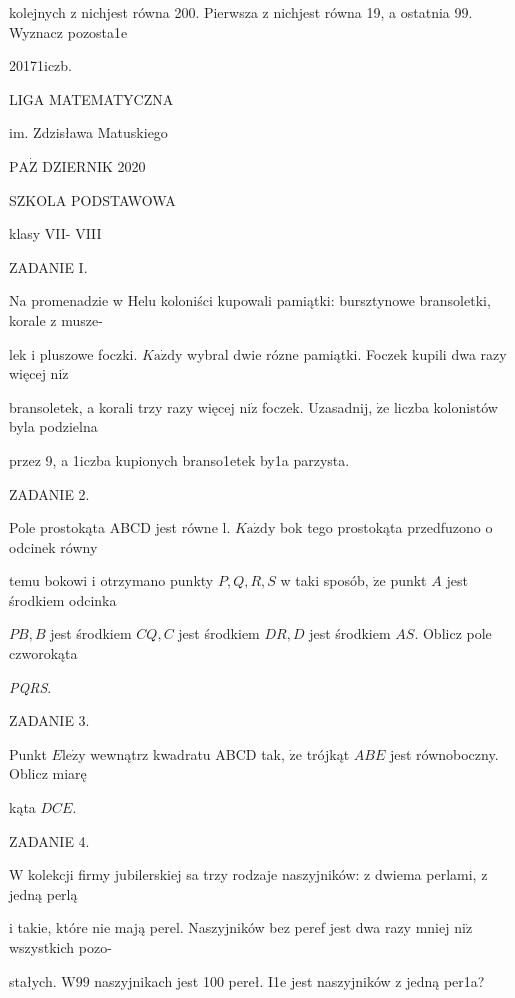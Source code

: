 \documentclass[a4paper,12pt]{article}
\begin{document}
kolejnych z nichjest równa 200. Pierwsza z nichjest równa 19, a ostatnia 99. Wyznacz pozosta1e

20171iczb.






LIGA MATEMATYCZNA

im. Zdzisława Matuskiego

$\mathrm{P}\mathrm{A}\dot{\mathrm{Z}}$ DZIERNIK 2020

SZKOLA PODSTAWOWA

klasy VII- VIII

ZADANIE I.

Na promenadzie w Helu koloniści kupowali pamiątki: bursztynowe bransoletki, korale z musze-

lek i pluszowe foczki. $K\mathrm{a}\dot{\mathrm{z}}\mathrm{d}\mathrm{y}$ wybral dwie rózne pamiątki. Foczek kupili dwa razy więcej $\mathrm{n}\mathrm{i}\dot{\mathrm{z}}$

bransoletek, a korali trzy razy więcej $\mathrm{n}\mathrm{i}\dot{\mathrm{z}}$ foczek. Uzasadnij, $\dot{\mathrm{z}}\mathrm{e}$ liczba kolonistów byla podzielna

przez 9, a 1iczba kupionych branso1etek by1a parzysta.

ZADANIE 2.

Pole prostokąta ABCD jest równe l. $K\mathrm{a}\dot{\mathrm{z}}\mathrm{d}\mathrm{y}$ bok tego prostokąta przedfuzono o odcinek równy

temu bokowi i otrzymano punkty $P, Q, R, S$ w taki sposób, $\dot{\mathrm{z}}\mathrm{e}$ punkt $A$ jest środkiem odcinka

$PB, B$ jest środkiem $CQ, C$ jest środkiem $DR, D$ jest środkiem $AS$. Oblicz pole czworokąta

{\it PQRS}.

ZADANIE 3.

Punkt $E\mathrm{l}\mathrm{e}\dot{\mathrm{z}}\mathrm{y}$ wewnątrz kwadratu ABCD tak, $\dot{\mathrm{z}}\mathrm{e}$ trójkąt $ABE$ jest równoboczny. Oblicz miarę

kąta $DCE.$

ZADANIE 4.

$\mathrm{W}$ kolekcji firmy jubilerskiej sa trzy rodzaje naszyjników: z dwiema perlami, z jedną perlą

i takie, które nie mają perel. Naszyjników bez peref jest dwa razy mniej $\mathrm{n}\mathrm{i}\dot{\mathrm{z}}$ wszystkich pozo-

stałych. $\mathrm{W}99$ naszyjnikach jest 100 pereł. I1e jest naszyjników z jedną per1a?
\end{document}
